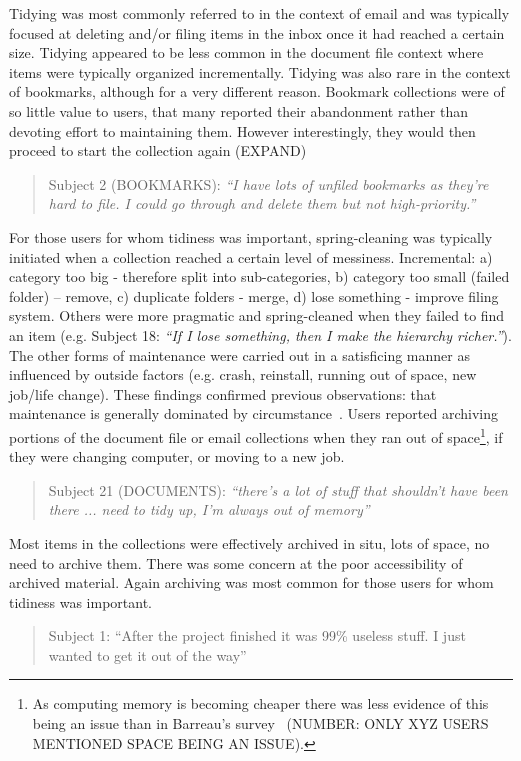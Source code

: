 \noindent
Tidying was most commonly referred to in the context of email and was typically focused at deleting and/or filing items in the inbox once it had reached a certain size.  Tidying appeared to be less common in the document file context where items were typically organized incrementally. Tidying was also rare in the context of bookmarks, although for a very different reason.  Bookmark collections were of so little value to users, that many reported their abandonment rather than devoting effort to maintaining them. However interestingly, they would then proceed to start the collection again (EXPAND)
\begin{quote}
	Subject 2 (BOOKMARKS): \textit{``I have lots of unfiled bookmarks as they're hard to file. I could go through and delete them but not high-priority.''}
\end{quote}

\noindent
For those users for whom tidiness was important, spring-cleaning was typically initiated when a collection reached a certain level of messiness. 
Incremental: a) category too big - therefore split into sub-categories, b) category too small (failed folder) -- remove, c)  duplicate folders - merge, d) lose something - improve filing system.
Others were more pragmatic and spring-cleaned when they failed to find an item (e.g. Subject 18: \textit{``If I lose something, then I make the hierarchy richer.''}).
\\

\noindent
The other forms of maintenance were carried out in a satisficing manner as influenced by outside factors (e.g. crash, reinstall, running out of space, new job/life change).
These findings confirmed previous observations: that maintenance is generally dominated by circumstance~\cite{barreau:95}.
Users reported archiving portions of the document file or email collections when they ran out of space\footnote{As computing memory is becoming cheaper there was less evidence of this being an issue than in Barreau's survey~\cite{barreau:95} (NUMBER: ONLY XYZ USERS MENTIONED SPACE BEING AN ISSUE).}, if they were changing computer, or moving to a new job.
\begin{quote}
	Subject 21 (DOCUMENTS): \textit{``there's a lot of stuff that shouldn't have been there ... need to tidy up, I'm always out of memory''}
\end{quote}

\noindent
Most items in the collections were effectively archived in situ, lots of space, no need to archive them. There was some concern at the poor accessibility of archived material.  Again archiving was most common for those users for whom tidiness was important.
\begin{quote}
	Subject 1: ``After the project finished it was 99\% useless stuff. I just wanted to get it out of the way''
\end{quote}

